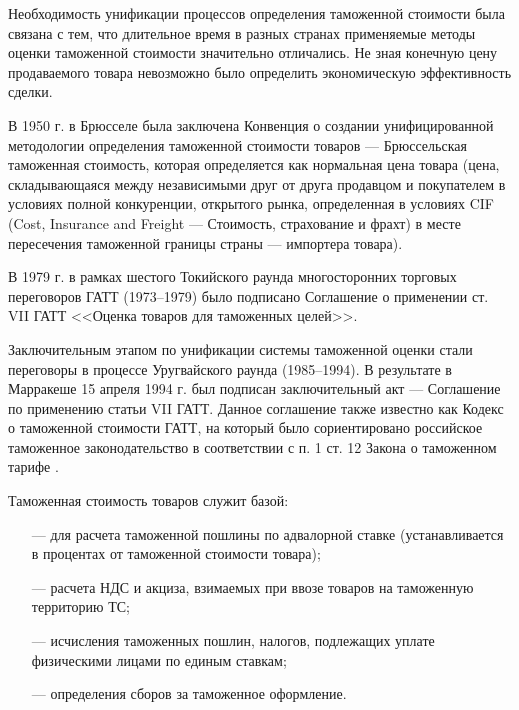 Необходимость унификации процессов определения таможенной стоимости была связана с тем, что длительное время в разных странах применяемые методы оценки таможенной стоимости значительно отличались. Не зная конечную цену продаваемого товара невозможно было определить экономическую эффективность сделки.

В 1950 г. в Брюсселе была заключена Конвенция о создании унифицированной методологии определения таможенной стоимости товаров  --- Брюссельская таможенная стоимость, которая определяется как нормальная цена товара (цена, складывающаяся между независимыми друг от друга продавцом и покупателем в условиях полной конкуренции, открытого рынка, определенная в условиях CIF (Cost, Insurance and Freight --- Стоимость, страхование и фрахт) в месте пересечения таможенной границы страны --- импортера товара).

В 1979 г. в рамках шестого Токийского раунда многосторонних торговых переговоров ГАТТ (1973--1979) было подписано Соглашение о применении ст. VII ГАТТ <<Оценка товаров для таможенных целей>>.

Заключительным этапом по унификации системы таможенной оценки стали переговоры в процессе Уругвайского раунда (1985--1994). В результате в Марракеше 15 апреля 1994 г. был подписан заключительный акт --- Соглашение по применению статьи VII ГАТТ. Данное соглашение также известно как Кодекс о таможенной стоимости ГАТТ, на который было сориентировано российское таможенное законодательство в соответствии с п. 1 ст. 12 Закона о таможенном тарифе \cites[с. 251]{mahovikova}[с. 125]{novikova}.


Таможенная стоимость товаров служит базой:
\begin{enumerate}
	\item [---] для расчета таможенной пошлины по адвалорной ставке (устанавливается в процентах от таможенной стоимости товара);
	\item [---] расчета НДС и акциза, взимаемых при ввозе товаров на таможенную территорию ТС;
	\item [---] исчисления таможенных пошлин, налогов, подлежащих уплате физическими лицами по единым ставкам;
	\item [---] определения сборов за таможенное оформление.
\end{enumerate}

